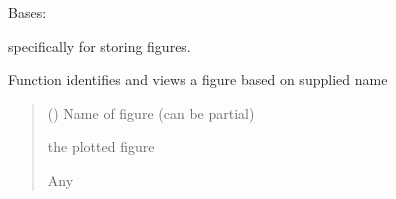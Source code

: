 \documentclass[letterpaper,10pt,english]{sphinxmanual}
\begin{document}

\begin{fulllineitems}
\label{\detokenize{Organization:Organization.Figures}}
\pysigstartsignatures
{}
\pysigstopsignatures
\sphinxAtStartPar
Bases: {\hyperref[\detokenize{Organization:Organization.Data}]{}}

\sphinxAtStartPar
{} specifically for storing figures.

\begin{fulllineitems}
\label{\detokenize{Organization:Organization.Figures.view_figure}}
\pysigstartsignatures
{}
\pysigstopsignatures
\sphinxAtStartPar
Function identifies and views a figure based on supplied name
\begin{quote}\begin{description}
\sphinxAtStartPar
{} () \textendash{} Name of figure (can be partial)

\sphinxAtStartPar
the plotted figure

\sphinxAtStartPar
Any

\end{description}\end{quote}

\end{fulllineitems}


\end{fulllineitems}

\end{document}

